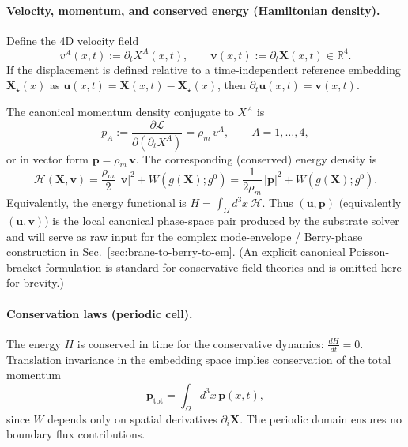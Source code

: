 \paragraph{Velocity, momentum, and conserved energy (Hamiltonian density).}
Define the $4$D velocity field
\begin{equation}
  v^A(x,t) := \partial_t X^A(x,t),
  \qquad
  \mathbf v(x,t) := \partial_t \mathbf X(x,t)\in\mathbb R^4.
  \label{eq:velocity-field}
\end{equation}
If the displacement is defined relative to a time-independent reference embedding
$\mathbf X_\star(x)$ as $\mathbf u(x,t)=\mathbf X(x,t)-\mathbf X_\star(x)$, then
$\partial_t\mathbf u(x,t)=\mathbf v(x,t)$.

The canonical momentum density conjugate to $X^A$ is
\begin{equation}
  p_A := \frac{\partial \mathcal L}{\partial(\partial_t X^A)}
  = \rho_m\,v^A,
  \qquad A=1,\dots,4,
  \label{eq:canonical-momentum}
\end{equation}
or in vector form $\mathbf p=\rho_m\,\mathbf v$.
The corresponding (conserved) energy density is
\begin{equation}
  \mathcal H(\mathbf X,\mathbf v)
  = \frac{\rho_m}{2}\,|\mathbf v|^2 + W(g(\mathbf X);g^0)
  = \frac{1}{2\rho_m}\,|\mathbf p|^2 + W(g(\mathbf X);g^0).
  \label{eq:brane-hamiltonian-density}
\end{equation}
Equivalently, the energy functional is $H=\int_\Omega d^3x\,\mathcal H$.
Thus $(\mathbf u,\mathbf p)$ (equivalently $(\mathbf u,\mathbf v)$)
is the local canonical phase-space pair produced by the substrate solver and will
serve as raw input for the complex mode-envelope / Berry-phase construction in
Sec.~\ref{sec:brane-to-berry-to-em}.
(An explicit canonical Poisson-bracket formulation is standard for conservative
field theories and is omitted here for brevity.)

\paragraph{Conservation laws (periodic cell).}
The energy $H$ is conserved in time for the conservative dynamics: $\frac{dH}{dt}=0$.
Translation invariance in the embedding space implies conservation of the total momentum
\begin{equation}
  \mathbf p_{\text{tot}} = \int_{\Omega} d^3x\, \mathbf p(x,t),
  \label{eq:total-momentum}
\end{equation}
since $W$ depends only on spatial derivatives $\partial_i\mathbf X$.
The periodic domain ensures no boundary flux contributions.

